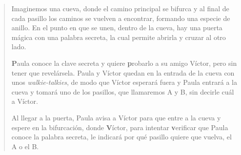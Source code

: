\begin{quote}
	Imaginemos una cueva, donde el camino principal se bifurca y al final de cada pasillo los caminos se vuelven a encontrar, formando una especie de anillo. En el punto en que se unen, dentro de la cueva, hay una puerta mágica con una palabra secreta, la cual permite abrirla y cruzar al otro lado.
	
	\textbf{P}aula conoce la clave secreta y quiere \textbf{p}robarlo a su amigo Víctor, pero sin tener que revelársela.
	Paula y Víctor quedan en la entrada de la cueva con unos \textit{walkie-talkies}, de modo que Víctor esperará fuera y Paula entrará a la cueva y tomará uno de los pasillos, que llamaremos A y B, sin decirle cuál a Víctor.
	
	
	Al llegar a la puerta, Paula avisa a Víctor para que entre a la cueva y espere en la bifurcación, donde \textbf{V}íctor, para intentar \textbf{v}erificar que Paula conoce la palabra secreta, le indicará por qué pasillo quiere que vuelva, el A o el B.
	
	
	

\end{quote}
